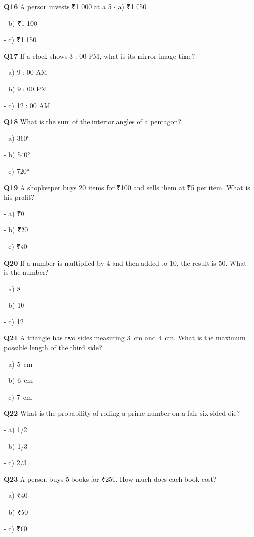 \textbf{Q16} A person invests ₹1 000 at a 5 %
\quad - a) ₹1 050\par
\quad - b) ₹1 100\par
\quad - c) ₹1 150\par

\textbf{Q17} If a clock shows 3 : 00 PM, what is its mirror‑image time?\par
\quad - a) 9 : 00 AM\par
\quad - b) 9 : 00 PM\par
\quad - c) 12 : 00 AM\par

\textbf{Q18} What is the sum of the interior angles of a pentagon?\par
\quad - a) 360°\par
\quad - b) 540°\par
\quad - c) 720°\par

\textbf{Q19} A shopkeeper buys 20 items for ₹100 and sells them at ₹5 per item. What is his profit?\par
\quad - a) ₹0\par
\quad - b) ₹20\par
\quad - c) ₹40\par

\textbf{Q20} If a number is multiplied by 4 and then added to 10, the result is 50. What is the number?\par
\quad - a) 8\par
\quad - b) 10\par
\quad - c) 12\par

\textbf{Q21} A triangle has two sides measuring 3 cm and 4 cm. What is the maximum possible length of the third side?\par
\quad - a) 5 cm\par
\quad - b) 6 cm\par
\quad - c) 7 cm\par

\textbf{Q22} What is the probability of rolling a prime number on a fair six‑sided die?\par
\quad - a) 1/2\par
\quad - b) 1/3\par
\quad - c) 2/3\par

\textbf{Q23} A person buys 5 books for ₹250. How much does each book cost?\par
\quad - a) ₹40\par
\quad - b) ₹50\par
\quad - c) ₹60\par


